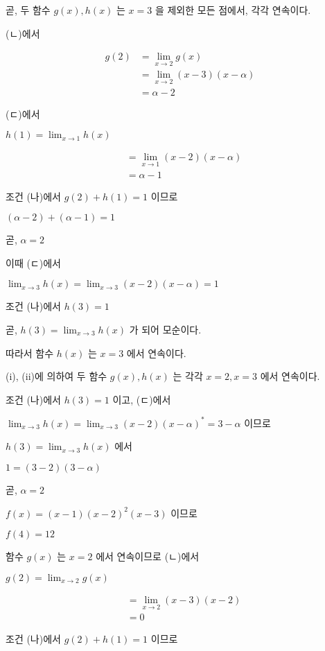 \documentclass[10pt]{article}
\begin{document}
곧, 두 함수 $g(x), h(x)$ 는 $x=3$ 을 제외한 모든 점에서, 각각 연속이다.

(ㄴ)에서

\[
\begin{aligned}
g(2) & =\lim _{x \rightarrow 2} g(x) \\
& =\lim _{x \rightarrow 2}(x-3)(x-\alpha) \\
& =\alpha-2
\end{aligned}
\]

(ㄷ)에서

$h(1)=\lim _{x \rightarrow 1} h(x)$

\[
\begin{aligned}
& =\lim _{x \rightarrow 1}(x-2)(x-\alpha) \\
& =\alpha-1
\end{aligned}
\]

조건 (나)에서 $g(2)+h(1)=1$ 이므로

$(\alpha-2)+(\alpha-1)=1$

곧, $\alpha=2$

이때 (ㄷ)에서

$\lim _{x \rightarrow 3} h(x)=\lim _{x \rightarrow 3}(x-2)(x-\alpha)=1$

조건 (나)에서 $h(3)=1$

곧, $h(3)=\lim _{x \rightarrow 3} h(x)$ 가 되어 모순이다.

따라서 함수 $h(x)$ 는 $x=3$ 에서 연속이다.

(i), (ii)에 의하여 두 함수 $g(x), h(x)$ 는 각각 $x=2, x=3$ 에서 연속이다.

조건 (나)에서 $h(3)=1$ 이고, (ㄷ)에서

$\lim _{x \rightarrow 3} h(x)=\lim _{x \rightarrow 3}(x-2)(x-\alpha)^{*}=3-\alpha$ 이므로

$h(3)=\lim _{x \rightarrow 3} h(x)$ 에서

$1=(3-2)(3-\alpha)$

곧, $\alpha=2$

$f(x)=(x-1)(x-2)^{2}(x-3)$ 이므로

$f(4)=12$

함수 $g(x)$ 는 $x=2$ 에서 연속이므로 (ㄴ)에서

$g(2)=\lim _{x \rightarrow 2} g(x)$

\[
\begin{aligned}
& =\lim _{x \rightarrow 2}(x-3)(x-2) \\
& =0
\end{aligned}
\]

조건 (나)에서 $g(2)+h(1)=1$ 이므로
\end{document}
